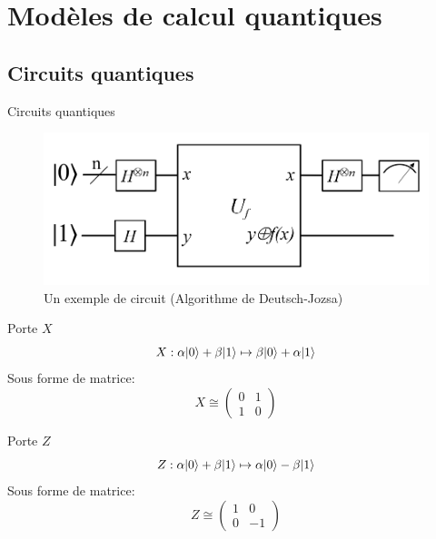 \documentclass[aspectratio=169]{beamer}
\theoremstyle{plain}
\theoremstyle{definition}
\DeclarePairedDelimiter\ket{\lvert}{\rangle}
\begin{document}
\section{Modèles de calcul quantiques}
\subsection{Circuits quantiques}
\begin{frame}{Circuits quantiques}
    \begin{figure}[!ht]
        \centering
        \includegraphics[scale=0.5]{deutsch-circuit-n.png}
        \caption{Un exemple de circuit (Algorithme de Deutsch-Jozsa)}
    \end{figure}
\end{frame}

\begin{frame}{Porte $X$}
    \begin{equation*}
        X : \alpha\ket{0} + \beta\ket{1} \mapsto \beta\ket{0} + \alpha\ket{1}
    \end{equation*}
    Sous forme de matrice:
    \begin{equation*}
        X \cong \begin{pmatrix}
            0&1\\
            1&0
        \end{pmatrix}
    \end{equation*}
\end{frame}

\begin{frame}{Porte $Z$}
    \begin{equation*}
        Z : \alpha\ket{0} + \beta\ket{1} \mapsto \alpha\ket{0} - \beta\ket{1}
    \end{equation*}
    Sous forme de matrice:
    \begin{equation*}
        Z \cong \begin{pmatrix}
            1&0\\
            0&-1
        \end{pmatrix}
    \end{equation*}
\end{frame}
\end{document}
